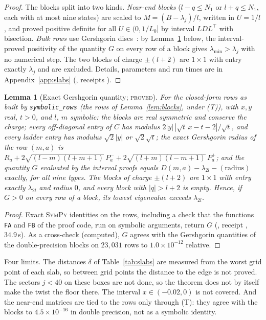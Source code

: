 \documentclass[11pt]{article}
\newtheorem{lemma}[theorem]{Lemma}
\theoremstyle{definition}
\theoremstyle{remark}
\newcommand{\PROVED}{\textsc{proved}}
\begin{document}
\begin{proof}
The blocks split into two kinds. \emph{Near-end blocks} ($l-q\le N_1$ or $l+q\le N_1$, each with at most nine states)
are scaled to $M=(B-\lambda_j)/l$, written in $U=1/l$, and proved positive definite for all $U\in(0,1/L_0]$ by interval
$LDL^\top$ with bisection. \emph{Bulk rows} use Gershgorin discs~\cite{varga2001}: by Lemma~\ref{lem:gersh} below, the
interval-proved positivity of the quantity $G$ on every row of a block gives $\lambda_{\min}>\lambda_j$ with no numerical
step. The two blocks of charge $\pm(l+2)$ are $1\times1$ with entry exactly $\lambda_j$ and are excluded. Details,
parameters and run times are in Appendix~\ref{app:slabs} (, receipts
).
\end{proof}

\begin{lemma}[Exact Gershgorin quantity; \PROVED]\label{lem:gersh}
For the closed-form rows as built by \texttt{symbolic\_rows} (the rows of Lemma~\ref{lem:blocks}, under (T)), with $x,y$ real, $t>0$, and $l$, $m$ symbolic: the blocks are real symmetric and
conserve the charge; every off-diagonal entry of $C$ has modulus $2|y|\,|\sqrt t\,x-t-2|/\sqrt t$, and every ladder entry
has modulus $\sqrt2|y|$ or $\sqrt2\sqrt t$; the exact Gershgorin radius of the row $(m,a)$ is
$R_a+2\sqrt{(l-m)(l+m+1)}\,P^-_a+2\sqrt{(l+m)(l-m+1)}\,P^+_a$; and the quantity $G$ evaluated by the interval proofs
equals $D(m,a)-\lambda_{2l}-(\text{radius})$ exactly, for all nine types. The blocks of charge $\pm(l+2)$ are $1\times1$
with entry exactly $\lambda_{2l}$ and radius $0$, and every block with $|q|>l+2$ is empty. Hence, if $G>0$ on every row of
a block, its lowest eigenvalue exceeds $\lambda_{2l}$.
\end{lemma}
\begin{proof}
Exact \textsc{SymPy} identities on the rows, including a check that the functions \texttt{FA} and \texttt{FB} of the
proof code, run on symbolic arguments, return $G$ (, receipt
, $34.9$\,s). As a cross-check (computed), $G$ agrees
with the Gershgorin quantities of the double-precision blocks on $23{,}031$ rows to $1.0\times10^{-12}$ relative.
\end{proof}

Four limits. The distances $\delta$ of Table~\ref{tab:slabs} are measured from the worst grid point of each slab, so
between grid points the distance to the edge is not proved. The sectors $j<40$ on these boxes are not done, so the
theorem does not by itself make the twist the floor there. The interval $x\in(-0.02,0)$ is not covered. And the
near-end matrices are tied to the rows only through (T): they agree with the blocks to $4.5\times10^{-16}$ in double
precision, not as a symbolic identity.
\end{document}
